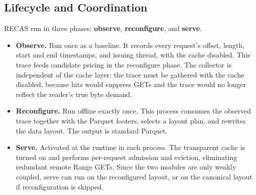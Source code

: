 \subsection{Lifecycle and Coordination}
RECAS run in three phases: \textbf{observe}, \textbf{reconfigure}, and \textbf{serve}. 

\begin{itemize}
    \item \textbf{Observe.} Run once as a baseline. It records every request's offset, length, start and end timestamps, and issuing thread, with the cache disabled. This trace feeds candidate pricing in the reconfigure phase. The collector is independent of the cache layer: the trace must be gathered with the cache disabled, because hits would suppress GETs and the trace would no longer reflect the reader's true byte demand.
    \item \textbf{Reconfigure.} Run offline exactly once. This process consumes the observed trace together with the Parquet footers, selects a layout plan, and rewrites the data layout. The output is standard Parquet.
    \item \textbf{Serve.} Activated at the runtime in each process. The transparent cache is turned on and performs per-request admission and eviction, eliminating redundant remote Range GETs. Since the two modules are only weakly coupled, serve can run on the reconfigured layout, or on the canonical layout if reconfiguration is skipped.
\end{itemize}

